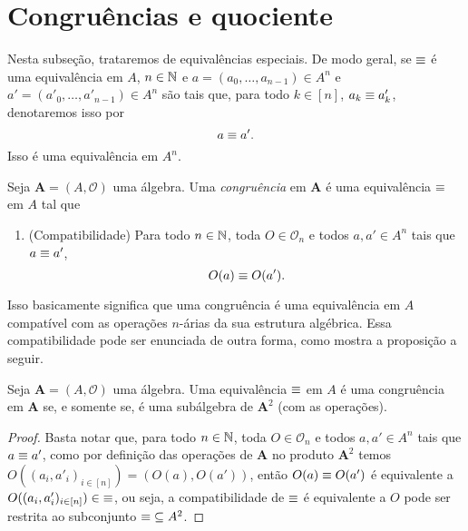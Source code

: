 \section{Congruências e quociente}

Nesta subseção, trataremos de equivalências especiais. De modo geral, se $\equiv$ é uma equivalência em $A$, $n \in \mathbb{N}$ e $a = (a_0,\ldots,a_{n-1}) \in A^n$ e $a' = (a'_0,\ldots,a'_{n-1}) \in A^n$ são tais que, para todo $k \in [n]$, $a_k \equiv a'_k$, denotaremos isso por
	\begin{equation*}
		a \equiv a'.
	\end{equation*}
Isso é uma equivalência em $A^n$.

\begin{definition}
Seja $\bm A = (A,\mathcal O)$ uma álgebra. Uma \emph{congruência} em $\bm A$ é uma equivalência $\equiv$ em $A$ tal que
	\begin{enumerate}
		\item (Compatibilidade) Para todo $n \in \mathbb{N}$, toda $O \in \mathcal O_n$ e todos $a,a' \in A^n$ tais que $a \equiv a'$,
			\begin{equation*}
				O(a) \equiv O(a').
			\end{equation*}
	\end{enumerate}
\end{definition}

Isso basicamente significa que uma congruência é uma equivalência em $A$ compatível com as operações $n$-árias da sua estrutura algébrica. Essa compatibilidade pode ser enunciada de outra forma, como mostra a proposição a seguir.

\begin{proposition}
Seja $\bm A = (A,\mathcal O)$ uma álgebra. Uma equivalência $\equiv$ em $A$ é uma congruência em $\bm A$ se, e somente se, é uma subálgebra de $\bm A^2$ (com as operações).
\end{proposition}
\begin{proof}
	Basta notar que, para todo $n \in \mathbb{N}$, toda $O \in \mathcal O_n$ e todos $a,a' \in A^n$ tais que $a \equiv a'$, como por definição das operações de $\bm A$ no produto $\bm A^2$ temos $O((a_i,a'_i)_{i \in [n]}) = (O(a),O(a'))$, então $O(a) \equiv O(a')$ é equivalente a $O((a_i,a'_i)_{i \in [n]}) \in \mathord{\equiv}$, ou seja, a compatibilidade de $\equiv$ é equivalente a $O$ pode ser restrita ao subconjunto $\mathord{\equiv} \subseteq A^2$.
\end{proof}

